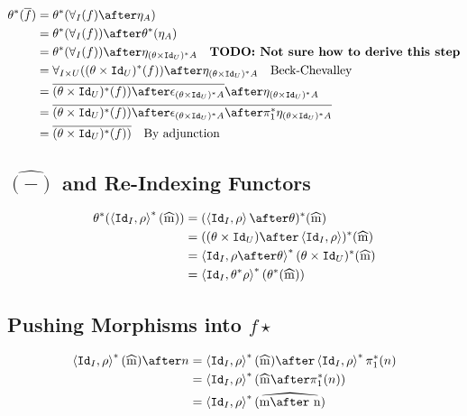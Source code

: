 \documentclass{report}
\begin{document}
\begin{align}
    \theta\star(\bar{f}) & = \theta\star(\allI(f)\after\eta_A)\\
    & = \theta\star(\allI(f))\after\theta\star(\eta_A)\\
    & = \theta\star(\allI(f))\after\eta_{(\theta\times \Id{U})\star A}\qt{\todo{Not sure how to derive this step}}\\
    & = \allIU((\theta\times\Id{U})\star(f))\after\eta_{(\theta\times \Id{U})\star A}\qt{Beck-Chevalley}\\
    &= \bar{(\theta\times\Id{U})\star(f))\after\epsilon_{(\theta\times\Id{U})\star A}}\after\eta_{(\theta\times \Id{U})\star A}
     \\
     &= \bar{(\theta\times\Id{U})\star(f))\after\epsilon_{(\theta\times\Id{U})\star A}\after\pstar\eta_{(\theta\times \Id{U})\star A}}\\
     & = \bar{(\theta\times\Id{U})\star(f))}\qt{By adjunction}
\end{align}

\subsection{$\hat{(-)}$ and Re-Indexing Functors}
\begin{align}
    \theta\star(\pr{\Id{I}}{\rho}\star(\widehat{m})) &= (\pr{\Id{I}}{\rho}\after\theta)\star(\widehat{m})\\
    & = ((\theta\times\Id{U})\after\pr{\Id{I}}{\rho})\star(\widehat{m})\\
    & = \pr{\Id{I}}{\rho\after\theta}\star(\theta\times\Id{U})\star(\widehat{m}) \\
    & = \pr{\Id{I}}{\theta\star\rho}\star(\theta\star(\widehat{m}))
\end{align}

\subsection{Pushing Morphisms into $f\star$}

\begin{align}
    \pr{\Id{I}}{\rho}\star(\widehat{m})\after n &= \pr{\Id{I}}{\rho}\star(\widehat{m})\after\pr{\Id{I}}{\rho}\star\p\star(n)\\
    & = \pr{\Id{I}}{\rho}\star(\widehat{m}\after\pstar(n))\\
    &= \pr{\Id{I}}{\rho}\star(\widehat{m\after n})
\end{align}
\end{document}
